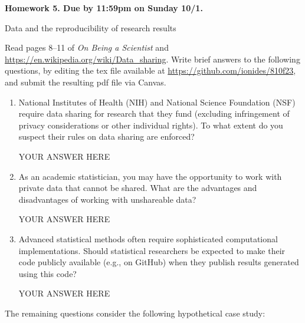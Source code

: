 \documentclass[12pt]{article}
\begin{document}
\begin{center}\bf
Homework 5. Due by 11:59pm on Sunday 10/1.

Data and the reproducibility of research results
\end{center}
Read pages 8--11 of {\em On Being a Scientist} and \url{https://en.wikipedia.org/wiki/Data_sharing}. Write brief answers to the following questions, by editing the tex file available at \url{https://github.com/ionides/810f23}, and submit the resulting pdf file via Canvas.

\begin{enumerate}

\item National Institutes of Health (NIH) and National Science Foundation (NSF) require data sharing for research that they fund (excluding infringement of privacy considerations or other individual rights). To what extent do you suspect their rules on data sharing are enforced?

YOUR ANSWER HERE

\item As an academic statistician, you may have the opportunity to work with private data that cannot be shared. What are the advantages and disadvantages of working with unshareable data?
  
YOUR ANSWER HERE
  

\item Advanced statistical methods often require sophisticated computational implementations. Should statistical researchers be expected to make their code publicly available (e.g., on GitHub) when they publish results generated using this code?

YOUR ANSWER HERE

\end{enumerate}
The remaining questions consider the following hypothetical case study:
\end{document}

